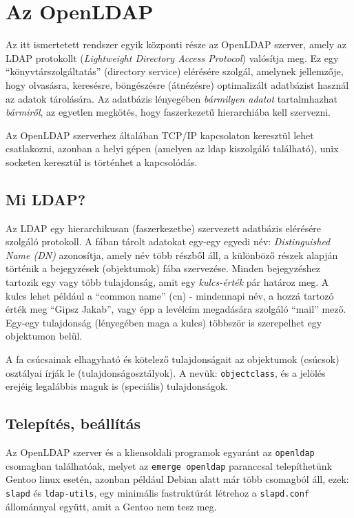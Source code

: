 \chapter{Az OpenLDAP}

Az itt ismertetett rendszer egyik központi része az OpenLDAP szerver, amely az LDAP protokollt ({\em Lightweight
  Directory Access Protocol}) valósítja meg. Ez egy ``könyvtárszolgáltatás''
(directory service) elérésére szolgál, amelynek jellemzője, hogy olvasásra, keresésre, böngészésre (átnézésre)
optimalizált adatbázist használ az adatok tárolására. Az adatbázis lényegében \emph{bármilyen adatot} tartalmhazhat
\emph{bármiről}, az egyetlen megkötés, hogy faszerkezetű hierarchiába kell szervezni.

Az OpenLDAP szerverhez általában TCP/IP kapcsolaton keresztül lehet csatlakozni, azonban a helyi gépen (amelyen az
ldap kiszolgáló található), unix socketen keresztül is történhet a kapcsolódás.

\section{Mi LDAP?}

Az LDAP egy hierarchikusan (faszerkezetbe) szervezett adatbázis elérésére szolgáló protokoll. A fában tárolt adatokat
egy-egy egyedi név: {\em Distinguished Name (DN)} azonosítja, amely név több részből áll, a  különböző részek alapján
történik a bejegyzések (objektumok) fába szervezése. Minden bejegyzéshez tartozik egy vagy több
tulajdonság, amit egy {\em kulcs-érték} pár határoz meg. A kulcs lehet például a ``common name'' (cn) - mindennapi
név, a hozzá tartozó érték meg ``Gipsz Jakab'', vagy épp a levélcím megadására szolgáló ``mail'' mező. Egy-egy
tulajdonság (lényegében maga a kulcs) többször is szerepelhet egy objektumon belül.

A fa csúcsainak elhagyható és kötelező tulajdonságait az objektumok (csúcsok) osztályai írják le
(tulajdonságosztályok). A nevük: \texttt{objectclass}, és a jelölés erejéig legalábbis  maguk is (speciális)
tulajdonságok.


\section{Telepítés, beállítás}
Az OpenLDAP szerver és a kliensoldali programok egyaránt az \texttt{openldap} csomagban találhatóak, melyet az
\texttt{emerge openldap} paranccsal telepíthetünk Gentoo linux esetén, azonban például Debian alatt már több csomagból
áll, ezek: \texttt{slapd} és \texttt{ldap-utils}, egy minimális fastruktúrát létrehoz a \texttt{slapd.conf}
állománnyal együtt, amit a Gentoo nem tesz meg.

